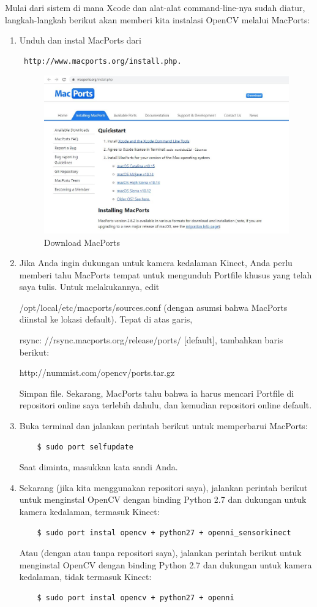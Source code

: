 Mulai dari sistem di mana Xcode dan alat-alat command-line-nya sudah diatur, langkah-langkah berikut akan memberi kita instalasi OpenCV melalui MacPorts:
\newpage
\begin{enumerate}
	\item Unduh dan instal MacPorts dari \begin{verbatim} http://www.macports.org/install.php. \end{verbatim}
		\begin{figure}[ht]
		\centering
		\includegraphics[scale=0.4]{figures/1,11.jpg}
		\caption{Download MacPorts}
		\label{contoh}
		\end{figure}
	\item Jika Anda ingin dukungan untuk kamera kedalaman Kinect, Anda perlu memberi tahu MacPorts tempat untuk mengunduh Portfile khusus yang telah saya tulis. Untuk melakukannya, edit

	/opt/local/etc/macports/sources.conf (dengan asumsi bahwa MacPorts diinstal ke lokasi default). Tepat di atas garis,

	rsync: //rsync.macports.org/release/ports/ [default], tambahkan baris berikut:

	http://nummist.com/opencv/ports.tar.gz

	Simpan file. Sekarang, MacPorts tahu bahwa ia harus mencari Portfile di repositori online saya terlebih dahulu, dan kemudian repositori online default.
	\item Buka terminal dan jalankan perintah berikut untuk memperbarui MacPorts:
	\begin{verbatim}
	$ sudo port selfupdate
	\end{verbatim}
	Saat diminta, masukkan kata sandi Anda.
	\item Sekarang (jika kita menggunakan repositori saya), jalankan perintah berikut untuk menginstal OpenCV dengan binding Python 2.7 dan dukungan untuk kamera kedalaman, termasuk Kinect:
	\begin{verbatim}
	$ sudo port instal opencv + python27 + openni_sensorkinect
	\end{verbatim}
	Atau (dengan atau tanpa repositori saya), jalankan perintah berikut untuk menginstal OpenCV dengan binding Python 2.7 dan dukungan untuk kamera kedalaman, tidak termasuk Kinect:
	\begin{verbatim}
	$ sudo port instal opencv + python27 + openni
	\end{verbatim}


\end{enumerate}
